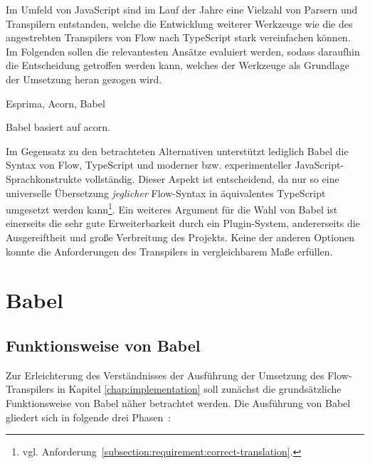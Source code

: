 Im Umfeld von JavaScript sind im Lauf der Jahre eine Vielzahl von Parsern und Transpilern entstanden, welche die Entwicklung weiterer Werkzeuge wie die des angestrebten Transpilers von Flow nach TypeScript stark vereinfachen können. Im Folgenden sollen die relevantesten Ansätze evaluiert werden, sodass daraufhin die Entscheidung getroffen werden kann, welches der Werkzeuge als Grundlage der Umsetzung heran gezogen wird.

Esprima, Acorn, Babel

Babel basiert auf acorn.


Im Gegensatz zu den betrachteten Alternativen unterstützt lediglich Babel die Syntax von Flow, TypeScript und moderner bzw. experimenteller JavaScript-Sprachkonstrukte vollständig. Dieser Aspekt ist entscheidend, da nur so eine universelle Übersetzung \emph{jeglicher} Flow-Syntax in äquivalentes TypeScript umgesetzt werden kann\footnote{vgl. Anforderung~\ref{subsection:requirement:correct-translation}.}. Ein weiteres Argument für die Wahl von Babel ist einerseits die sehr gute Erweiterbarkeit durch ein Plugin-System, andererseits die Ausgereiftheit und große Verbreitung des Projekts. Keine der anderen Optionen konnte die Anforderungen des Transpilers in vergleichbarem Maße erfüllen.

\section{Babel}
\label{sec:babel}

\subsection{Funktionsweise von Babel}

Zur Erleichterung des Verständnisses der Ausführung der Umsetzung des Flow-Transpilers in Kapitel \ref{chap:implementation} soll zunächst die grundsätzliche Funktionsweise von Babel näher betrachtet werden. Die Ausführung von Babel gliedert sich in folgende drei Phasen~\autocite{BABEL_HANDBOOK}:

